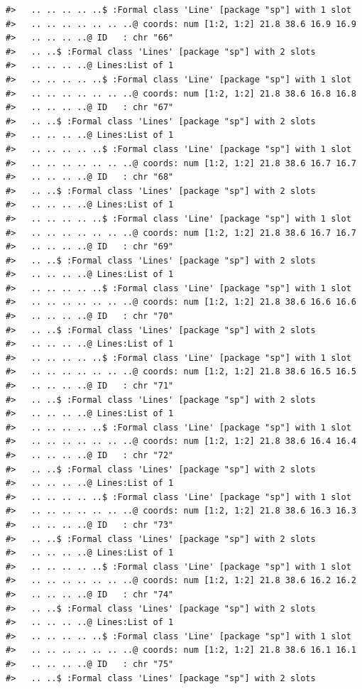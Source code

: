 \documentclass[12pt,a4paper,a4paper]{book}
\theoremstyle{definition}
\theoremstyle{definition}
\theoremstyle{definition}
\theoremstyle{remark}
\begin{document}
\begin{verbatim}
#>   .. .. .. .. ..$ :Formal class 'Line' [package "sp"] with 1 slot
#>   .. .. .. .. .. .. ..@ coords: num [1:2, 1:2] 21.8 38.6 16.9 16.9
#>   .. .. .. ..@ ID   : chr "66"
#>   .. ..$ :Formal class 'Lines' [package "sp"] with 2 slots
#>   .. .. .. ..@ Lines:List of 1
#>   .. .. .. .. ..$ :Formal class 'Line' [package "sp"] with 1 slot
#>   .. .. .. .. .. .. ..@ coords: num [1:2, 1:2] 21.8 38.6 16.8 16.8
#>   .. .. .. ..@ ID   : chr "67"
#>   .. ..$ :Formal class 'Lines' [package "sp"] with 2 slots
#>   .. .. .. ..@ Lines:List of 1
#>   .. .. .. .. ..$ :Formal class 'Line' [package "sp"] with 1 slot
#>   .. .. .. .. .. .. ..@ coords: num [1:2, 1:2] 21.8 38.6 16.7 16.7
#>   .. .. .. ..@ ID   : chr "68"
#>   .. ..$ :Formal class 'Lines' [package "sp"] with 2 slots
#>   .. .. .. ..@ Lines:List of 1
#>   .. .. .. .. ..$ :Formal class 'Line' [package "sp"] with 1 slot
#>   .. .. .. .. .. .. ..@ coords: num [1:2, 1:2] 21.8 38.6 16.7 16.7
#>   .. .. .. ..@ ID   : chr "69"
#>   .. ..$ :Formal class 'Lines' [package "sp"] with 2 slots
#>   .. .. .. ..@ Lines:List of 1
#>   .. .. .. .. ..$ :Formal class 'Line' [package "sp"] with 1 slot
#>   .. .. .. .. .. .. ..@ coords: num [1:2, 1:2] 21.8 38.6 16.6 16.6
#>   .. .. .. ..@ ID   : chr "70"
#>   .. ..$ :Formal class 'Lines' [package "sp"] with 2 slots
#>   .. .. .. ..@ Lines:List of 1
#>   .. .. .. .. ..$ :Formal class 'Line' [package "sp"] with 1 slot
#>   .. .. .. .. .. .. ..@ coords: num [1:2, 1:2] 21.8 38.6 16.5 16.5
#>   .. .. .. ..@ ID   : chr "71"
#>   .. ..$ :Formal class 'Lines' [package "sp"] with 2 slots
#>   .. .. .. ..@ Lines:List of 1
#>   .. .. .. .. ..$ :Formal class 'Line' [package "sp"] with 1 slot
#>   .. .. .. .. .. .. ..@ coords: num [1:2, 1:2] 21.8 38.6 16.4 16.4
#>   .. .. .. ..@ ID   : chr "72"
#>   .. ..$ :Formal class 'Lines' [package "sp"] with 2 slots
#>   .. .. .. ..@ Lines:List of 1
#>   .. .. .. .. ..$ :Formal class 'Line' [package "sp"] with 1 slot
#>   .. .. .. .. .. .. ..@ coords: num [1:2, 1:2] 21.8 38.6 16.3 16.3
#>   .. .. .. ..@ ID   : chr "73"
#>   .. ..$ :Formal class 'Lines' [package "sp"] with 2 slots
#>   .. .. .. ..@ Lines:List of 1
#>   .. .. .. .. ..$ :Formal class 'Line' [package "sp"] with 1 slot
#>   .. .. .. .. .. .. ..@ coords: num [1:2, 1:2] 21.8 38.6 16.2 16.2
#>   .. .. .. ..@ ID   : chr "74"
#>   .. ..$ :Formal class 'Lines' [package "sp"] with 2 slots
#>   .. .. .. ..@ Lines:List of 1
#>   .. .. .. .. ..$ :Formal class 'Line' [package "sp"] with 1 slot
#>   .. .. .. .. .. .. ..@ coords: num [1:2, 1:2] 21.8 38.6 16.1 16.1
#>   .. .. .. ..@ ID   : chr "75"
#>   .. ..$ :Formal class 'Lines' [package "sp"] with 2 slots

\end{verbatim}
\end{document}
